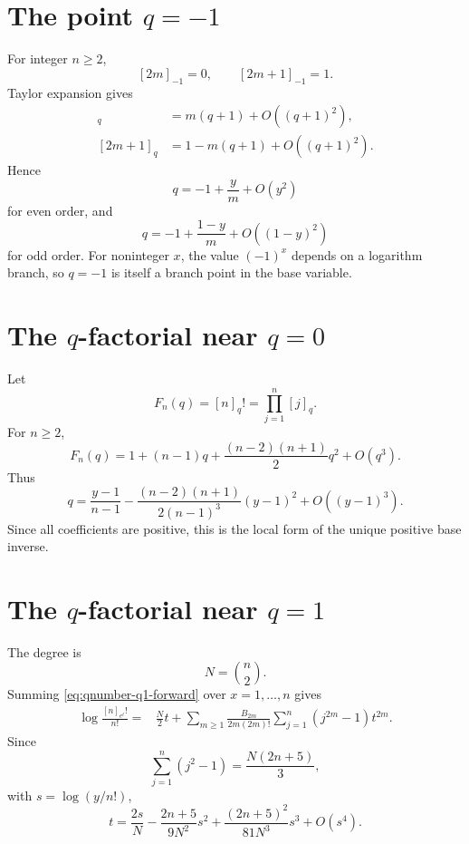 \documentclass[11pt,letterpaper,oneside,openany]{book}
\theoremstyle{definition}
\theoremstyle{remark}
\begin{document}
\section{The point \texorpdfstring{\(q=-1\)}{q=-1}}
For integer \(n\ge2\),
\[
 [2m]_{-1}=0,
 \qquad [2m+1]_{-1}=1.
\]
Taylor expansion gives
\begin{align}
 [2m]_q&=m(q+1)+O((q+1)^2),\label{eq:qnumber-even-minusone}\\
 [2m+1]_q&=1-m(q+1)+O((q+1)^2).
 \label{eq:qnumber-odd-minusone}
\end{align}
Hence
\[
 q=-1+\frac ym+O(y^2)
\]
for even order, and
\[
 q=-1+\frac{1-y}{m}+O((1-y)^2)
\]
for odd order.  For noninteger \(x\), the value \((-1)^x\) depends on a
logarithm branch, so \(q=-1\) is itself a branch point in the base variable.

\section{The \texorpdfstring{\(q\)}{q}-factorial near \texorpdfstring{\(q=0\)}{q=0}}
Let
\[
 F_n(q)=[n]_q!=\prod_{j=1}^n[j]_q.
\]
For \(n\ge2\),
\[
 F_n(q)=1+(n-1)q+\frac{(n-2)(n+1)}2q^2+O(q^3).
\]
Thus
\begin{equation}\label{eq:qfactorial-q0-inverse}
 q=\frac{y-1}{n-1}
 -\frac{(n-2)(n+1)}{2(n-1)^3}(y-1)^2+O((y-1)^3).
\end{equation}
Since all coefficients are positive, this is the local form of the unique
positive base inverse.

\section{The \texorpdfstring{\(q\)}{q}-factorial near \texorpdfstring{\(q=1\)}{q=1}}
The degree is
\[
 N=\binom n2.
\]
Summing \eqref{eq:qnumber-q1-forward} over \(x=1,\ldots,n\) gives
\begin{align}
 \log\frac{[n]_{e^t}!}{n!}
 ={}&\frac N2t+
 \sum_{m\ge1}\frac{B_{2m}}{2m(2m)!}
 \sum_{j=1}^n(j^{2m}-1)t^{2m}.
 \label{eq:qfactorial-q1-forward}
\end{align}
Since
\[
 \sum_{j=1}^n(j^2-1)=\frac{N(2n+5)}3,
\]
with \(s=\log(y/n!)\),
\begin{equation}\label{eq:qfactorial-q1-inverse}
 t=\frac{2s}{N}-\frac{2n+5}{9N^2}s^2
 +\frac{(2n+5)^2}{81N^3}s^3+O(s^4).
\end{equation}
\end{document}
